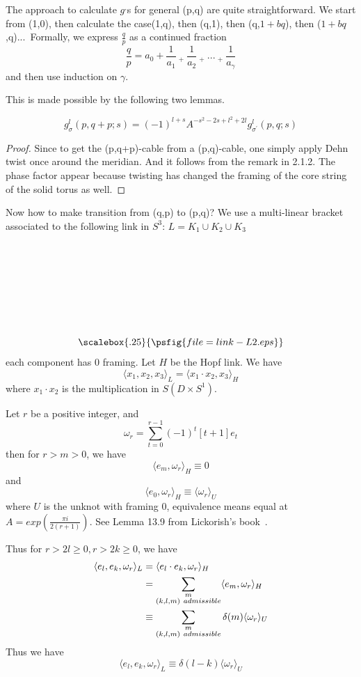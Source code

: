 The approach to calculate $g^,$s for general (p,q) are quite straightforward. We start from (1,0), then calculate the case(1,q),
then (q,1), then (q,$1+bq$), then ($1+bq$,q)...\ Formally, we express $\frac{q}{p}$ as a continued fraction
\[\frac{q}{p}=a_0+\frac{1}{a_1}\ _{+}\ \frac{1}{a_2}\ _{+}\ ...\ _{+}\ \frac{1}{a_\gamma}\]
and then use induction on $\gamma$.

This is made possible by the following two lemmas.

\begin{lemma}
\[g_\sigma^l(p,q+p;s)=(-1)^{l+s}A^{-s^2-2s+l^2+2l}g_{\sigma^\prime}^l(p,q;s)\]
\end{lemma}

\begin{proof} Since to get the (p,q+p)-cable from a (p,q)-cable, one simply apply Dehn twist once around the meridian. And it
follows from the remark in 2.1.2. The phase factor appear because twisting has changed the framing of the core string of the solid torus as well.
\end{proof}

 Now how to make transition from (q,p) to (p,q)? We use a multi-linear bracket associated to the following
 link in $S^3$: $L=K_1\cup K_2\cup K_3$

\

\ 

\ 

\ 

\[\scalebox{.25}{\psfig{file=link-L2.eps}}\] each component has 0
framing.  Let $H$ be the Hopf link. We have
\[\langle x_1,x_2, x_3\rangle_L=\langle x_1\cdot x_2,x_3\rangle_H\]
where $x_1\cdot x_2$ is the multiplication in $S(D\times S^1)$.

Let $r$ be a positive integer, and
\[\omega_r=\sum_{t=0}^{r-1} (-1)^t[t+1]e_t\]
then for $r>m>0$, we have
\[\langle e_m,\omega_r\rangle_H\equiv 0\]
and
\[\langle e_0,\omega_r\rangle_H\equiv \langle\omega_r\rangle_U\]
where $U$ is the unknot with framing 0, equivalence means equal at
$A=exp\left(\frac {\pi i}{2(r+1)}\right)$. See Lemma 13.9 from
Lickorish's book~\cite{LBook}.

Thus for $r>2l\ge0,r>2k\ge0$, we have
\begin{align}\langle e_l,e_k,\omega_r\rangle_L&=\langle e_l\cdot e_k,\omega_r\rangle_H\notag\\
                       &=\sum_{\substack{m\\(k,l,m)\ admissible}}\langle e_m,\omega_r\rangle_H\notag\\
                       &\equiv \sum_{\substack{m\\(k,l,m)\ admissible}}\delta(m)\langle\omega_r\rangle_U\notag\end{align}
 Thus we have
 \[\langle e_l,e_k,\omega_r\rangle_L\equiv\delta(l-k)\langle\omega_r\rangle_U\tag {*}\]

